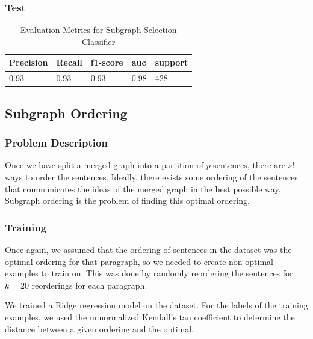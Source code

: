 \documentclass[12pt]{article}
\begin{document}
\subsubsection{Test}

\begin{table}[H]
\centering
\caption{Evaluation Metrics for Subgraph Selection Classifier}
\label{tab:subgraph_selection_eval}
\begin{tabular}{@{}lllll@{}}
\toprule
\textbf{Precision} & \textbf{Recall} & \textbf{f1-score} & \textbf{auc} & \textbf{support} \\ \midrule
0.93               & 0.93            & 0.93              & 0.98         & 428              \\ \bottomrule
\end{tabular}
\end{table}

\subsection{Subgraph Ordering}
\subsubsection{Problem Description}

Once we have split a merged graph into a partition of $p$ sentences, there are
$s!$ ways to order the sentences. Ideally, there exists some ordering of the
sentences that communicates the ideas of the merged graph in the best possible
way. Subgraph ordering is the problem of finding this optimal ordering.

\subsubsection{Training}

Once again, we assumed that the ordering of sentences in the dataset was the
optimal ordering for that paragraph, so we needed to create non-optimal
examples to train on. This was done by randomly reordering the sentences for
$k=20$ reorderings for each paragraph.

We trained a Ridge regression model on the dataset. For the labels of the
training examples, we used the unnormalized Kendall's tau coefficient to
determine the distance between a given ordering and the optimal.
\end{document}
